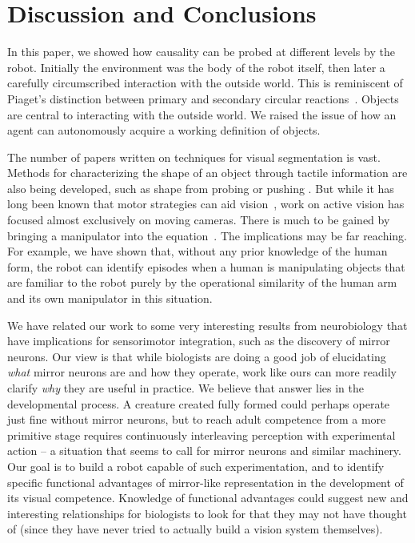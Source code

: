 
\section{Discussion and Conclusions}

In this paper, we showed how causality can be probed at different
levels by the robot.  Initially the environment was the body of the
robot itself, then later a carefully circumscribed interaction with
the outside world.  This is reminiscent of Piaget's distinction
between primary and secondary circular
reactions~\cite{ginsburg78piaget}.  Objects are central to interacting
with the outside world.  We raised the issue of how an agent can
autonomously acquire a working definition of objects. 

The number of papers written on techniques for visual segmentation is
vast.  Methods for characterizing the shape of an object through
tactile information are also being developed, such as shape from
probing 
\cite{paulos99fast} 
or pushing
\cite{moll01reconstructing}.  
But while it has long
been known that motor strategies can aid
vision~\cite{ballard91animate}, work on active vision has focused
almost exclusively on moving cameras.  There is much to be gained by
bringing a manipulator into the equation~\cite{tsikos91segmentation}.
The implications may be far reaching.  For example,
we have shown that, without any prior knowledge of the human form, 
the robot can identify episodes when a human is manipulating objects
that are familiar to the robot purely by the operational similarity 
of the human arm and its own manipulator in this situation.

We have related our work to some very interesting results from
neurobiology that have implications for sensorimotor integration, such
as the discovery of mirror neurons.  Our view is that while biologists
are doing a good job of elucidating {\em what} mirror neurons are and
how they operate, work like ours can more readily clarify {\em why}
they are useful in practice.  We believe that answer lies in the
developmental process.  A creature created fully formed could perhaps
operate just fine without mirror neurons, but to reach adult
competence from a more primitive stage requires continuously
interleaving perception with experimental action -- a situation that
seems to call for mirror neurons and similar machinery.  Our goal is
to build a robot capable of such experimentation, and to identify
specific functional advantages of mirror-like representation in the
development of its visual competence.  Knowledge of functional
advantages could suggest new and interesting relationships for biologists to
look for that they may not have thought of (since they have never
tried to actually build a vision system themselves).


